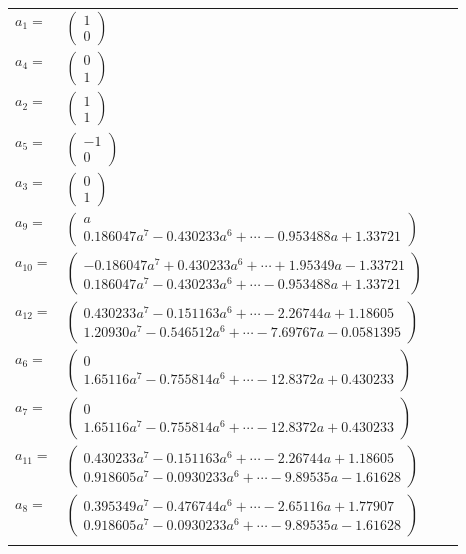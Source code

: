 \documentclass[1p]{elsarticle_modified}
\theoremstyle{definition}
\begin{document}
\begin{tabular}{m{7pt} m{180pt} m{7pt} m{180pt} }
\flushright $a_{1}=$&$\begin{pmatrix}1\\0\end{pmatrix}$ \\
\flushright $a_{4}=$&$\begin{pmatrix}0\\1\end{pmatrix}$ \\
\flushright $a_{2}=$&$\begin{pmatrix}1\\1\end{pmatrix}$ \\
\flushright $a_{5}=$&$\begin{pmatrix}-1\\0\end{pmatrix}$ \\
\flushright $a_{3}=$&$\begin{pmatrix}0\\1\end{pmatrix}$ \\
\flushright $a_{9}=$&$\begin{pmatrix}a\\0.186047 a^{7}-0.430233 a^{6}+\cdots-0.953488 a+1.33721\end{pmatrix}$ \\
\flushright $a_{10}=$&$\begin{pmatrix}-0.186047 a^{7}+0.430233 a^{6}+\cdots+1.95349 a-1.33721\\0.186047 a^{7}-0.430233 a^{6}+\cdots-0.953488 a+1.33721\end{pmatrix}$ \\
\flushright $a_{12}=$&$\begin{pmatrix}0.430233 a^{7}-0.151163 a^{6}+\cdots-2.26744 a+1.18605\\1.20930 a^{7}-0.546512 a^{6}+\cdots-7.69767 a-0.0581395\end{pmatrix}$ \\
\flushright $a_{6}=$&$\begin{pmatrix}0\\1.65116 a^{7}-0.755814 a^{6}+\cdots-12.8372 a+0.430233\end{pmatrix}$ \\
\flushright $a_{7}=$&$\begin{pmatrix}0\\1.65116 a^{7}-0.755814 a^{6}+\cdots-12.8372 a+0.430233\end{pmatrix}$ \\
\flushright $a_{11}=$&$\begin{pmatrix}0.430233 a^{7}-0.151163 a^{6}+\cdots-2.26744 a+1.18605\\0.918605 a^{7}-0.0930233 a^{6}+\cdots-9.89535 a-1.61628\end{pmatrix}$ \\
\flushright $a_{8}=$&$\begin{pmatrix}0.395349 a^{7}-0.476744 a^{6}+\cdots-2.65116 a+1.77907\\0.918605 a^{7}-0.0930233 a^{6}+\cdots-9.89535 a-1.61628\end{pmatrix}$\\&\end{tabular}
\end{document}
